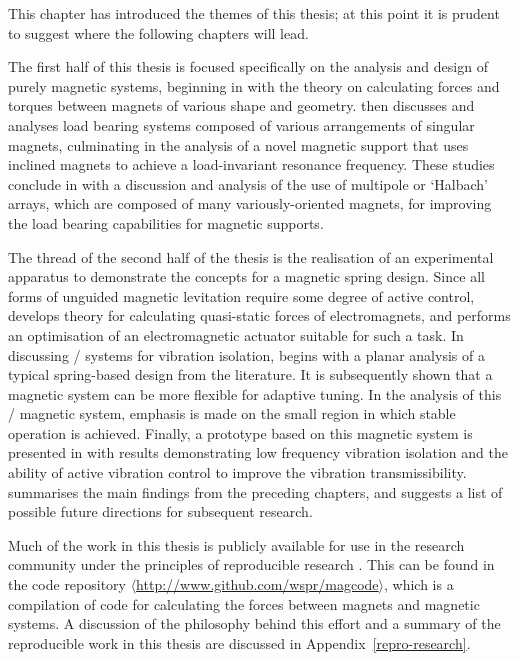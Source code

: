 \documentclass[11pt,a4paper]{memoir}
\begin{document}
This chapter has introduced the themes of this thesis; at this point it is prudent to suggest where the following chapters will lead.

The first half of this thesis is focused specifically on the analysis and design of purely magnetic systems, beginning in  with the theory on calculating forces and torques between magnets of various shape and geometry.
 then discusses and analyses load bearing systems composed of various arrangements of singular magnets, culminating in the analysis of a novel magnetic support that uses inclined magnets to achieve a load-invariant resonance frequency.
These studies conclude in  with a discussion and analysis of the use of multipole or `Halbach' arrays, which are composed of many variously-oriented magnets, for improving the load bearing capabilities for magnetic supports.

The thread of the second half of the thesis is the realisation of an experimental apparatus to demonstrate the concepts for a magnetic spring design.
Since all forms of unguided magnetic levitation require some degree of active control,  develops theory for calculating quasi-static forces of electromagnets, and performs an optimisation of an electromagnetic actuator suitable for such a task.
In discussing \qzs/ systems for vibration isolation,  begins with a planar analysis of a  typical spring-based design from the literature.
It is subsequently shown that a magnetic system can be more flexible for adaptive tuning.
In the analysis of this \qzs/ magnetic system, emphasis is made on the small region in which stable operation is achieved.
Finally, a prototype based on this magnetic system is presented in  with results demonstrating low frequency vibration isolation and the ability of active vibration control to improve the vibration transmissibility.
 summarises the main findings from the preceding chapters, and suggests a list of possible future directions for subsequent research.

Much of the work in this thesis is publicly available for use in the research community under the principles of reproducible research \parencite{kovacevic2007-icassp}.
This can be found in the code repository $\langle$\url{http://www.github.com/wspr/magcode}$\rangle$, which is a compilation of code for calculating the forces between magnets and magnetic systems.
A discussion of the philosophy behind this effort and a summary of the reproducible work in this thesis are discussed in Appendix~\ref{repro-research}.
\end{document}
